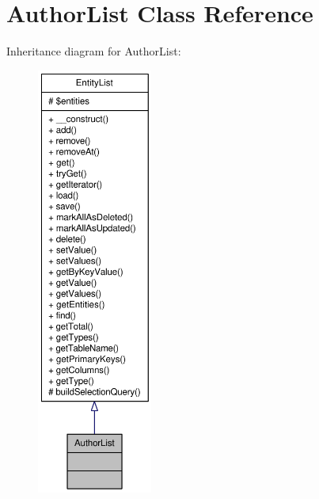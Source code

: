 \hypertarget{classAuthorList}{
\section{AuthorList Class Reference}
\label{classAuthorList}
}


Inheritance diagram for AuthorList:\nopagebreak
\begin{figure}[H]
\begin{center}
\leavevmode
\includegraphics[height=400pt]{classAuthorList__inherit__graph}
\end{center}
\end{figure}



